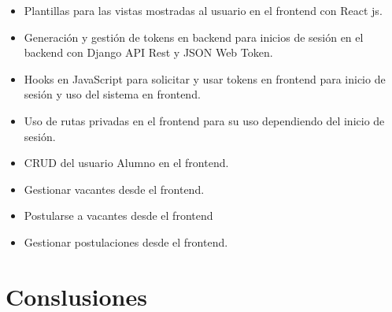 \begin{itemize}
	\item Plantillas para las vistas mostradas al usuario en el frontend con React js.
	\item Generación y gestión de tokens en backend para inicios de sesión en el backend con Django API Rest y JSON Web Token.
	\item Hooks en JavaScript para solicitar y usar tokens en frontend para inicio de sesión y uso del sistema en frontend.
	\item Uso de rutas privadas en el frontend para su uso dependiendo del inicio de sesión.
	\item CRUD del usuario Alumno en el frontend.
	\item Gestionar vacantes desde el frontend.
	\item Postularse a vacantes desde el frontend
	\item Gestionar postulaciones desde el frontend.
\end{itemize}
\section{Conslusiones}


